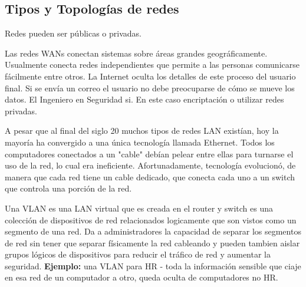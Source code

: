\subsection{Tipos y Topologías de redes}

Redes pueden ser públicas o privadas. 

Las redes WANs conectan sistemas sobre áreas grandes geográficamente. Usualmente conecta redes independientes que permite a las personas comunicarse fácilmente entre otros. La Internet oculta los detalles de este proceso del usuario final. Si se envía un correo el usuario no debe preocuparse de cómo se mueve los datos. El Ingeniero en Seguridad si. En este caso encriptación o utilizar redes privadas. 

A pesar que al final del siglo 20 muchos tipos de redes LAN existían, hoy la mayoría ha convergido a una única tecnología llamada Ethernet. Todos los computadores conectados a un "cable" debían pelear entre ellas para turnarse el uso de la red, lo cual era ineficiente. Afortunadamente, tecnología evolucionó, de manera que cada red tiene un cable dedicado, que conecta cada uno a un switch que controla una porción de la red. 


Una VLAN es una LAN virtual que es creada en el router y switch es una colección de dispositivos de red relacionados logicamente que son vistos como un segmento de una red. Da a administradores la capacidad de separar los segmentos de red sin tener que separar físicamente la red cableando y pueden tambien aislar grupos lógicos de dispositivos para reducir el tráfico de red y aumentar la seguridad.  \textbf{Ejemplo:} una VLAN para HR - toda la información sensible que ciaje en esa red de un computador a otro, queda oculta de computadores no HR. 

